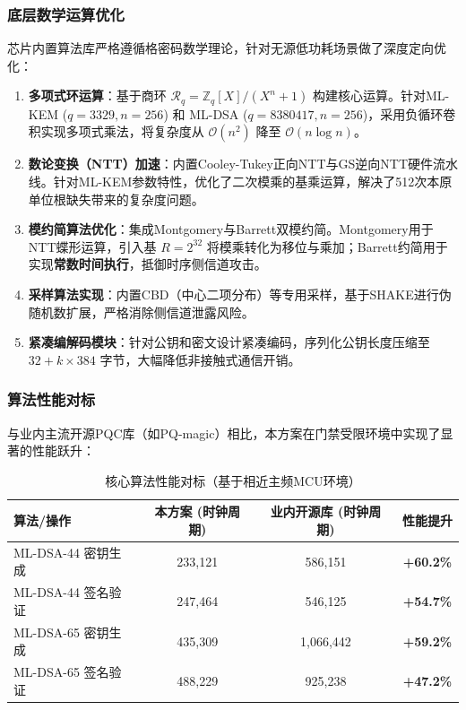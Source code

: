 \subsubsection{底层数学运算优化}

芯片内置算法库严格遵循格密码数学理论，针对无源低功耗场景做了深度定向优化：
\begin{enumerate}
	\item \textbf{多项式环运算}：基于商环 $\mathcal{R}_q=\mathbb{Z}_q[X]/(X^n+1)$ 构建核心运算。针对ML-KEM ($q=3329, n=256$) 和 ML-DSA ($q=8380417, n=256$)，采用负循环卷积实现多项式乘法，将复杂度从 $\mathcal{O}(n^2)$ 降至 $\mathcal{O}(n\log n)$。
	\item \textbf{数论变换（NTT）加速}：内置Cooley-Tukey正向NTT与GS逆向NTT硬件流水线。针对ML-KEM参数特性，优化了二次模乘的基乘运算，解决了512次本原单位根缺失带来的复杂度问题。
	\item \textbf{模约简算法优化}：集成Montgomery与Barrett双模约简。Montgomery用于NTT蝶形运算，引入基 $R=2^{32}$ 将模乘转化为移位与乘加；Barrett约简用于实现\textbf{常数时间执行}，抵御时序侧信道攻击。
	\item \textbf{采样算法实现}：内置CBD（中心二项分布）等专用采样，基于SHAKE进行伪随机数扩展，严格消除侧信道泄露风险。
	\item \textbf{紧凑编解码模块}：针对公钥和密文设计紧凑编码，序列化公钥长度压缩至 $32 + k \times 384$ 字节，大幅降低非接触式通信开销。
\end{enumerate}

\subsubsection{算法性能对标}

与业内主流开源PQC库（如PQ-magic）相比，本方案在门禁受限环境中实现了显著的性能跃升：

\begin{table}[htbp]
	\centering
	\caption{核心算法性能对标（基于相近主频MCU环境）}
	\renewcommand{\arraystretch}{1.2}
	\begin{tabular}{lccc}
		\toprule
		\textbf{算法/操作} & \textbf{本方案 (时钟周期)} & \textbf{业内开源库 (时钟周期)} & \textbf{性能提升} \\
		\midrule
		ML-DSA-44 密钥生成 & 233,121 & 586,151 & \textbf{+60.2\%} \\
		ML-DSA-44 签名验证 & 247,464 & 546,125 & \textbf{+54.7\%} \\
		ML-DSA-65 密钥生成 & 435,309 & 1,066,442 & \textbf{+59.2\%} \\
		ML-DSA-65 签名验证 & 488,229 & 925,238 & \textbf{+47.2\%} \\
		\bottomrule
	\end{tabular}
\end{table}

